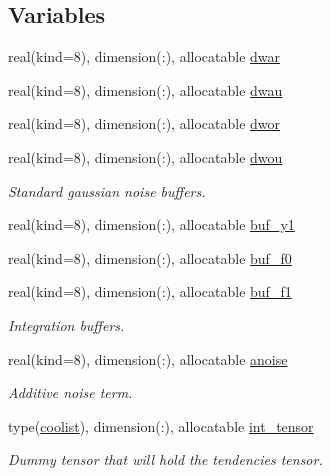 \subsection*{Variables}
\begin{DoxyCompactItemize}
\item 
real(kind=8), dimension(\+:), allocatable \hyperlink{namespacerk2__stoch__integrator_abfc963ed17f278357be8da9473244c38}{dwar}
\item 
real(kind=8), dimension(\+:), allocatable \hyperlink{namespacerk2__stoch__integrator_a01c22fa8c4f3e14201f3e0f32aa8cc3d}{dwau}
\item 
real(kind=8), dimension(\+:), allocatable \hyperlink{namespacerk2__stoch__integrator_afd5ed4abd1a2c69b89beb41d2718e702}{dwor}
\item 
real(kind=8), dimension(\+:), allocatable \hyperlink{namespacerk2__stoch__integrator_a8c5c398d4bf895571169d6fd78300df0}{dwou}
\begin{DoxyCompactList}\small\item\em Standard gaussian noise buffers. \end{DoxyCompactList}\item 
real(kind=8), dimension(\+:), allocatable \hyperlink{namespacerk2__stoch__integrator_a549cd39d4971e7b9268a4beb079feb80}{buf\+\_\+y1}
\item 
real(kind=8), dimension(\+:), allocatable \hyperlink{namespacerk2__stoch__integrator_a3dbdf4830785d5db95d610433de2d0bd}{buf\+\_\+f0}
\item 
real(kind=8), dimension(\+:), allocatable \hyperlink{namespacerk2__stoch__integrator_aea615b16fd861e4ccb1f26c4ee64df85}{buf\+\_\+f1}
\begin{DoxyCompactList}\small\item\em Integration buffers. \end{DoxyCompactList}\item 
real(kind=8), dimension(\+:), allocatable \hyperlink{namespacerk2__stoch__integrator_a7d810360a0ea3b9cc7878fd6cfe8e39d}{anoise}
\begin{DoxyCompactList}\small\item\em Additive noise term. \end{DoxyCompactList}\item 
type(\hyperlink{structtensor_1_1coolist}{coolist}), dimension(\+:), allocatable \hyperlink{namespacerk2__stoch__integrator_a0bf74d9bd925f796fa25569ab96997fb}{int\+\_\+tensor}
\begin{DoxyCompactList}\small\item\em Dummy tensor that will hold the tendencies tensor. \end{DoxyCompactList}\end{DoxyCompactItemize}


